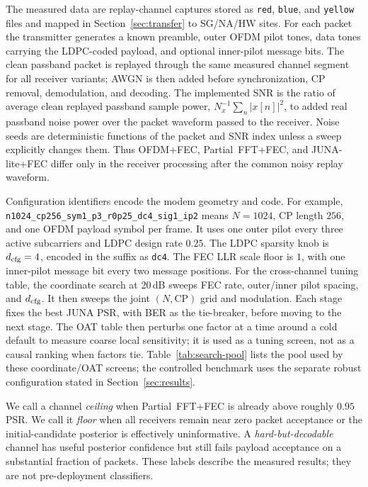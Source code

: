 \documentclass[journal]{IEEEtran}
\newcommand{\cfg}[1]{\texttt{#1}}
\newcommand{\junalite}{JUNA-lite}
\begin{document}
The measured data are replay-channel captures stored as \texttt{red},
\texttt{blue}, and \texttt{yellow} files and mapped in Section~\ref{sec:transfer}
to SG/NA/HW sites. For each packet the transmitter generates a known preamble,
outer OFDM pilot tones, data tones carrying the LDPC-coded payload, and optional
inner-pilot message bits. The clean passband packet is replayed through the same
measured channel segment for all receiver variants; AWGN is then added before
synchronization, CP removal, demodulation, and decoding. The implemented SNR is
the ratio of average clean replayed passband sample power,
$N_x^{-1}\sum_n |x[n]|^2$,
to added real passband noise power over the packet waveform passed to the
receiver. Noise seeds are deterministic functions of the packet and SNR index
unless a sweep explicitly changes them. Thus OFDM+FEC, Partial~FFT+FEC, and
\junalite{}+FEC differ only in the receiver processing after the common noisy
replay waveform.

Configuration identifiers encode the modem geometry and code. For example,
\cfg{n1024\_cp256\_sym1\_p3\_r0p25\_dc4\_sig1\_ip2} means $N=1024$, CP length
$256$, and one OFDM payload symbol per frame. It uses one outer pilot every
three active subcarriers and LDPC design rate $0.25$. The LDPC sparsity knob is
$d_{\rm cfg}=4$, encoded in the suffix as \cfg{dc4}. The FEC LLR scale floor is
$1$, with one inner-pilot message bit every two message positions. For the
cross-channel tuning table, the coordinate search at 20\,dB sweeps FEC rate,
outer/inner pilot spacing, and $d_{\rm cfg}$. It then sweeps the joint
$(N,\mathrm{CP})$ grid and modulation. Each stage fixes the best JUNA PSR, with
BER as the tie-breaker, before moving to the next stage. The OAT table then perturbs one factor at a
time around a cold default to measure coarse local sensitivity; it is used as a
tuning screen, not as a causal ranking when factors tie. Table~\ref{tab:search-pool}
lists the pool used by these coordinate/OAT screens; the controlled benchmark
uses the separate robust configuration stated in Section~\ref{sec:results}.

We call a channel \emph{ceiling} when Partial~FFT+FEC is already above roughly
$0.95$ PSR. We call it \emph{floor} when all receivers remain near zero packet
acceptance or the initial-candidate posterior is effectively uninformative. A
\emph{hard-but-decodable} channel has useful posterior confidence but still
fails payload acceptance on a substantial fraction of packets. These labels
describe the measured results; they are not pre-deployment classifiers.
\end{document}
